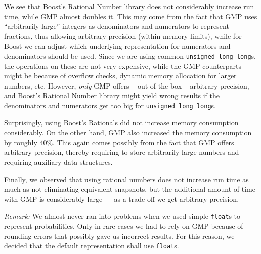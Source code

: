 We see that Boost's Rational Number library does not considerably increase run time, while GMP almost doubles it. This may come from the fact that GMP uses ``arbitrarily large'' integers as denominators and numerators to represent fractions, thus allowing arbitrary precision (within memory limits), while for Boost we can adjust which underlying representation for numerators and denominators should be used. Since we are using common \texttt{unsigned long long}s, the operations on these are not very expensive, while the GMP counterparts might be because of overflow checks, dynamic memory allocation for larger numbers, etc. However, \emph{only} GMP offers -- out of the box -- arbitrary precision, and Boost's Rational Number library might yield wrong results if the denominators and numerators get too big for \texttt{unsigned long long}s.

Surprisingly, using Boost's Rationals did not increase memory consumption considerably. On the other hand, GMP also increased the memory consumption by roughly 40\%. This again comes possibly from the fact that GMP offers arbitrary precision, thereby requiring to store arbitrarily large numbers and requiring auxiliary data structures.

Finally, we observed that using rational numbers does not increase run time as much as not eliminating equivalent snapshots, but the additional amount of time with GMP is considerably large --- as a trade off we get arbitrary precision.

\emph{Remark:} We almost never ran into problems when we used simple \texttt{float}s to represent probabilities. Only in rare cases we had to rely on GMP because of rounding errors that possibly gave us incorrect results. For this reason, we decided that the default representation shall use \texttt{float}s.

